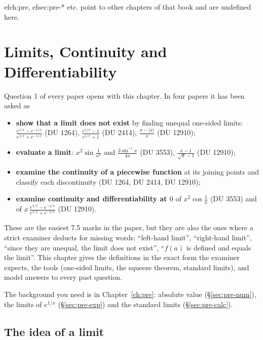 % 
ef{ch:pre}, 
ef{sec:pre-*} etc. point to other chapters of that book and are undefined here.

\chapter{Limits, Continuity and Differentiability}\label{ch:lim}

Question 1 of every paper opens with this chapter. In four papers it has been asked as
\begin{itemize}
\item \textbf{show that a limit does not exist} by finding unequal one-sided limits: $\frac{e^{1/x}-e^{-1/x}}{e^{1/x}+e^{-1/x}}$ (DU 1264), $\frac{e^{1/x}-1}{e^{1/x}+1}$ (DU 2414), $\frac{x-|x|}{x}$ (DU 12910);
\item \textbf{evaluate a limit}: $x^2\sin\frac1{x^2}$ and $\frac{3\sin^{-1}x}{4x}$ (DU 3553), $\frac{x-1}{\sqrt x-1}$ (DU 12910);
\item \textbf{examine the continuity of a piecewise function} at its joining points and classify each discontinuity (DU 1264, DU 2414, DU 12910);
\item \textbf{examine continuity and differentiability at $0$} of $x^2\cos\frac1x$ (DU 3553) and of $x\,\frac{e^{1/x}-e^{-1/x}}{e^{1/x}+e^{-1/x}}$ (DU 12910).
\end{itemize}
These are the easiest 7.5 marks in the paper, but they are also the ones where a strict examiner deducts for missing words: ``left-hand limit'', ``right-hand limit'', ``since they are unequal, the limit does not exist'', ``$f(a)$ is defined and equals the limit''. This chapter gives the definitions in the exact form the examiner expects, the tools (one-sided limits, the squeeze theorem, standard limits), and model answers to every past question.

The background you need is in Chapter~\ref{ch:pre}: absolute value (\S\ref{sec:pre-num}), the limits of $e^{1/x}$ (\S\ref{sec:pre-exp}) and the standard limits (\S\ref{sec:pre-calc}).

\section{The idea of a limit}\label{sec:lim-idea}

